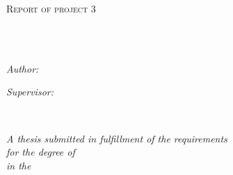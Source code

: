 \documentclass[
11pt, %
oneside, %
english, %
doublespacing,
headsepline, %
]{MastersDoctoralThesis} %
\author{Felicia \textsc{Burtscher}} %
\begin{document}
\frontmatter %

\pagestyle{plain} %


\begin{titlepage}
\begin{center}

\vspace*{.06\textheight}
{\scshape\LARGE \univname\par}\vspace{1.cm} %
\textsc{\Large Report of project 3}\\[0.5cm] %

\HRule \\[0.4cm] %
{\huge \bfseries \ttitle\par}\vspace{0.4cm} %
\HRule \\[1.5cm] %
 
\begin{minipage}[t]{0.4\textwidth}
\begin{flushleft} \large
\emph{Author:}\\
\href{https://burfel.github.io/}{\authorname} %
\end{flushleft}
\end{minipage}
\begin{minipage}[t]{0.4\textwidth}
\begin{flushright} \large
\emph{Supervisor:} \\
\href{https://www.imperial.ac.uk/people/g.sena}{\supname} %
\end{flushright}
\end{minipage}\\[2cm]
 
\vfill

\large \textit{A thesis submitted in fulfillment of the requirements\\ for the degree of \degreename}\\[0.3cm] %
\textit{in the}\\[0.4cm]
 \deptname\\[1cm]
\vfill


\end{center}
\end{titlepage}
\end{document}

